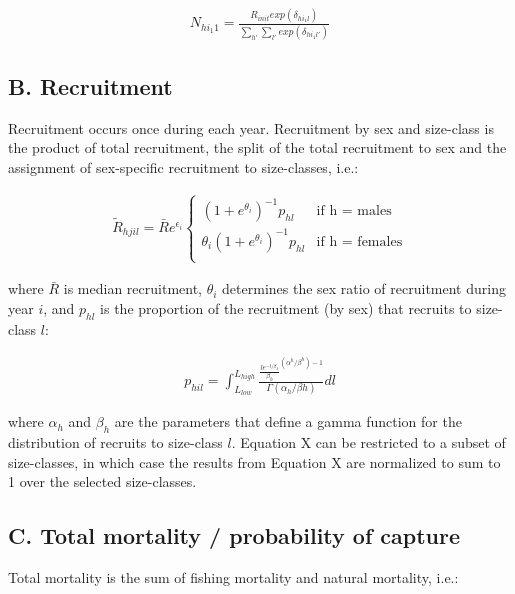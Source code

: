 \documentclass[]{article}
\begin{document}
\begin{align}
 N_{hi_{1}1} = \frac {R_{init}exp(\delta_{hi_{1}l})} {\sum_{h'} \sum_{l'} {exp(\delta_{hi_{1}l'})}}
\end{align}

\hypertarget{b.-recruitment}{%
\subsection{B. Recruitment}\label{b.-recruitment}}

Recruitment occurs once during each year. Recruitment by sex and
size-class is the product of total recruitment, the split of the total
recruitment to sex and the assignment of sex-specific recruitment to
size-classes, i.e.:

\begin{align}
 \widetilde{R}_{hjil} =  \bar{R} e^{\epsilon_{i}}
  \begin{cases}
    (1 + e^{\theta_{i}})^{-1} p_{hl} & \text{if h = males} \\[2ex]
    \theta_{i} (1 + e^{\theta_{i}})^{-1} p_{hl} & \text{if h = females} \\
    \end{cases}
    \end{align}

where \(\bar{R}\) is median recruitment, \(\theta_{i}\) determines the
sex ratio of recruitment during year \(i\), and \(p_{hl}\) is the
proportion of the recruitment (by sex) that recruits to size-class
\(l\):

\begin{align}
 p_{hil} = \int_{L_{low}}^{L_{high}} \frac {\frac{le^{-l/\beta_{h}}}{\beta_{h}}^{(\alpha^{h}/\beta^{h})-1}}{\Gamma(\alpha_{h}/\beta{h})} dl
\end{align}

where \(\alpha_{h}\) and \(\beta_{h}\) are the parameters that define a
gamma function for the distribution of recruits to size-class \(l\).
Equation X can be restricted to a subset of size-classes, in which case
the results from Equation X are normalized to sum to 1 over the selected
size-classes.

\hypertarget{c.-total-mortality-probability-of-capture}{%
\subsection{C. Total mortality / probability of
capture}\label{c.-total-mortality-probability-of-capture}}

Total mortality is the sum of fishing mortality and natural mortality,
i.e.:
\end{document}
